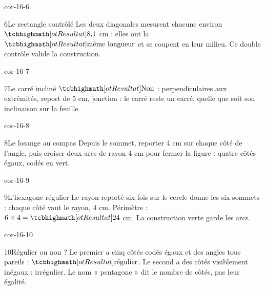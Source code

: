 \begin{blocLivre}{cor-16-6}\begin{corrige}{6}{Le rectangle contrôlé}
Les deux diagonales mesurent chacune environ $\res{8{,}1}$ cm : elles ont la $\res{\text{même longueur}}$ et se coupent en leur milieu. Ce double contrôle valide la construction.
\label{fig-cor-16-6}
\end{corrige}\end{blocLivre}
\begin{blocLivre}{cor-16-7}\begin{corrige}{7}{Le carré incliné}
$\res{\text{Non}}$ : perpendiculaires aux extrémités, report de 5 cm, jonction : le carré reste un carré, quelle que soit son inclinaison sur la feuille.
\label{fig-cor-16-7}
\end{corrige}\end{blocLivre}
\begin{blocLivre}{cor-16-8}\begin{corrige}{8}{Le losange au compas}
Depuis le sommet, reporter 4 cm sur chaque côté de l’angle, puis croiser deux arcs de rayon 4 cm pour fermer la figure : quatre côtés égaux, codés en vert.
\label{fig-cor-16-8}
\end{corrige}\end{blocLivre}
\begin{blocLivre}{cor-16-9}\begin{corrige}{9}{L’hexagone régulier}
Le rayon reporté six fois sur le cercle donne les six sommets : chaque côté vaut le rayon, 4 cm. Périmètre : $6\times4=\res{24}$ cm. La construction verte garde les arcs.
\label{fig-cor-16-9}
\end{corrige}\end{blocLivre}
\begin{blocLivre}{cor-16-10}\begin{corrige}{10}{Régulier ou non ?}
Le premier a cinq côtés codés égaux et des angles tous pareils : $\res{\text{régulier}}$. Le second a des côtés visiblement inégaux : irrégulier. Le nom « pentagone » dit le nombre de côtés, pas leur égalité.
\label{fig-cor-16-10}
\end{corrige}\end{blocLivre}
